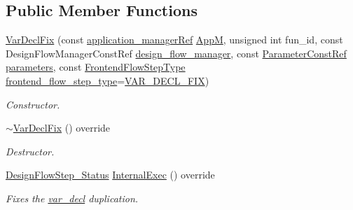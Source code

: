 \subsection*{Public Member Functions}
\begin{DoxyCompactItemize}
\item 
\hyperlink{classVarDeclFix_a8183b24fc37a61ac7045b26ddcc648a8}{Var\+Decl\+Fix} (const \hyperlink{application__manager_8hpp_a04ccad4e5ee401e8934306672082c180}{application\+\_\+manager\+Ref} \hyperlink{classFrontendFlowStep_a0ac0d8db2a378416583f51c4faa59d15}{AppM}, unsigned int fun\+\_\+id, const Design\+Flow\+Manager\+Const\+Ref \hyperlink{classDesignFlowStep_ab770677ddf087613add30024e16a5554}{design\+\_\+flow\+\_\+manager}, const \hyperlink{Parameter_8hpp_a37841774a6fcb479b597fdf8955eb4ea}{Parameter\+Const\+Ref} \hyperlink{classDesignFlowStep_a802eaafe8013df706370679d1a436949}{parameters}, const \hyperlink{frontend__flow__step_8hpp_afeb3716c693d2b2e4ed3e6d04c3b63bb}{Frontend\+Flow\+Step\+Type} \hyperlink{classFrontendFlowStep_ad49067d6a17119d47316149ab757b60d}{frontend\+\_\+flow\+\_\+step\+\_\+type}=\hyperlink{frontend__flow__step_8hpp_afeb3716c693d2b2e4ed3e6d04c3b63bba6735641c577494a8121e03b3c838ee21}{V\+A\+R\+\_\+\+D\+E\+C\+L\+\_\+\+F\+IX})
\begin{DoxyCompactList}\small\item\em Constructor. \end{DoxyCompactList}\item 
\hyperlink{classVarDeclFix_a6f0e5d0cab5b56639d77e0612816707f}{$\sim$\+Var\+Decl\+Fix} () override
\begin{DoxyCompactList}\small\item\em Destructor. \end{DoxyCompactList}\item 
\hyperlink{design__flow__step_8hpp_afb1f0d73069c26076b8d31dbc8ebecdf}{Design\+Flow\+Step\+\_\+\+Status} \hyperlink{classVarDeclFix_a41dbca562077d47c2d67bc7b7d2ef41d}{Internal\+Exec} () override
\begin{DoxyCompactList}\small\item\em Fixes the \hyperlink{structvar__decl}{var\+\_\+decl} duplication. \end{DoxyCompactList}\end{DoxyCompactItemize}
